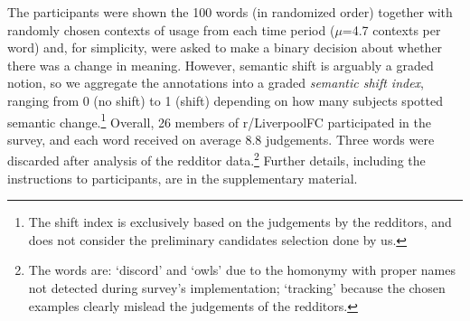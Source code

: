 The participants were shown the 100 words (in randomized order) together with randomly chosen contexts of usage from each time period ($\mu$=4.7 contexts per word) and, for simplicity, were asked to make a binary decision
about whether there was a change in meaning. However, semantic shift
is arguably a graded notion, so we aggregate the annotations into a
graded \emph{semantic shift index}, ranging from 0 (no shift) to 1
(shift) depending on how many subjects spotted semantic
change.\footnote{The shift index is exclusively based on the
  judgements by the redditors, and does not consider the preliminary
  candidates selection done by us.}  Overall, 26 members of
r/LiverpoolFC participated in the survey, and each word received on
average 8.8 judgements. Three words were discarded after analysis of
the redditor data.\footnote{The words are: `discord'  and `owls' due to the homonymy with proper names not detected during survey's implementation; `tracking' because the chosen examples clearly mislead the judgements of the redditors.} 
Further details, including the instructions to participants, are in
the supplementary material.








